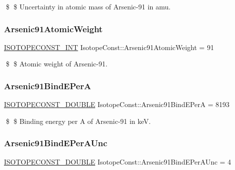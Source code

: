 \$ \$ Uncertainty in atomic mass of Arsenic-\/91 in amu. \mbox{\label{group___isotope_const-_arsenic-_as91_gaef2f9b8e1e5cc534b17126c294d3017f}} 
\subsubsection{\texorpdfstring{Arsenic91\+Atomic\+Weight}{Arsenic91AtomicWeight}}
{\footnotesize\ttfamily \mbox{\hyperlink{group___isotope_const-_macros_ga5f18360b3e99483a35c32d789e62621c}{I\+S\+O\+T\+O\+P\+E\+C\+O\+N\+S\+T\+\_\+\+I\+NT}} Isotope\+Const\+::\+Arsenic91\+Atomic\+Weight = 91}

\$ \$ Atomic weight of Arsenic-\/91. \mbox{\label{group___isotope_const-_arsenic-_as91_gab36c5514f9241ebeea238a07be9b795d}} 
\subsubsection{\texorpdfstring{Arsenic91\+Bind\+E\+PerA}{Arsenic91BindEPerA}}
{\footnotesize\ttfamily \mbox{\hyperlink{group___isotope_const-_macros_ga8f45a7272ce02c0b4c65c44636ed719a}{I\+S\+O\+T\+O\+P\+E\+C\+O\+N\+S\+T\+\_\+\+D\+O\+U\+B\+LE}} Isotope\+Const\+::\+Arsenic91\+Bind\+E\+PerA = 8193}

\$ \$ Binding energy per A of Arsenic-\/91 in keV. \mbox{\label{group___isotope_const-_arsenic-_as91_ga96c770d91661282bc9b048e125a8bb20}} 
\subsubsection{\texorpdfstring{Arsenic91\+Bind\+E\+Per\+A\+Unc}{Arsenic91BindEPerAUnc}}
{\footnotesize\ttfamily \mbox{\hyperlink{group___isotope_const-_macros_ga8f45a7272ce02c0b4c65c44636ed719a}{I\+S\+O\+T\+O\+P\+E\+C\+O\+N\+S\+T\+\_\+\+D\+O\+U\+B\+LE}} Isotope\+Const\+::\+Arsenic91\+Bind\+E\+Per\+A\+Unc = 4}

